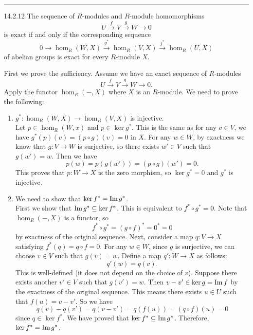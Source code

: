 \documentclass[a4paper, 12pt]{article}
\begin{document}
\noindent\rule{7in}{2.8pt}
\newpage 
\begin{problem}{14.2.12}
The sequence of \(R\)-modules and \(R\)-module homomorphisms 
\[U\xrightarrow{f}V\xrightarrow{g}W\rightarrow 0\]
is exact if and only if the corresponding sequence 
\[0\rightarrow \hom_R(W,X)\xrightarrow{g^*}\hom_R(V,X)\xrightarrow{f^*}\hom_R(U,X)\]
of abelian groups is exact for every \(R\)-module \(X\).
\end{problem}
\begin{solution}
First we prove the sufficiency. Assume we have an exact sequence of \(R\)-modules
\[U\xrightarrow{f}V\xrightarrow{g}W\rightarrow 0.\]
Apply the functor \(\hom_R(-,X)\) where \(X\) is an \(R\)-module. We need to prove the following:
\begin{enumerate}[(1)]
\item \(g^*:\hom_R(W,X)\rightarrow \hom_R(V,X)\) is injective.\\ 
Let \(p\in \hom_R(W,x)\) and \(p\in \ker g^*\). This is the same as for any \(v\in V\), we have \(g^*(p)(v)=(p\circ g)(v)=0\) in \(X\). For any \(w\in W\), by exactness we know that 
\(g:V\rightarrow W\) is surjective, so there exists \(w'\in V\) such that \(g(w')=w\). Then we have 
\[p(w)=p(g(w'))=(p\circ g)(w')=0.\]
This proves that \(p:W\rightarrow X\) is the zero morphism, so \(\ker g^*=0\) and \(g^*\) is injective.
\item We need to show that \(\ker f^*=\text{Im}\, g^*\).\\ 
First we show that \(\text{Im}\, g^*\subseteq \ker f^*\). This is equivalent to \(f^*\circ g^*=0\). Note that \(\hom_R(-,X)\) is a functor, so 
\[f^*\circ g^*=(g\circ f)^*=0^*=0\]
by exactness of the original sequence. Next, consider a map \(q:V\rightarrow X\) satisfying \(f^*(q)=q\circ f=0\). For any \(w\in W\), since \(g\) is surjective, we can choose \(v\in V\) such that \(g(v)=w\). Define 
a map \(q':W\rightarrow X\) as follows:
\[q'(w)=q(v).\]
This is well-defined (it does not depend on the choice of \(v\)). Suppose there exists another \(v'\in V\) such that \(g(v')=w\). Then \(v-v'\in \ker g=\text{Im}\, f \) by the exactness of the original sequence. This means 
there exists \(u\in U\) such that \(f(u)=v-v'\). So we have 
\[q(v)-q(v')=q(v-v')=q(f(u))=(q\circ f)(u)=0\]
since \(q\in \ker f^*\). We have proved that \(\ker f^*\subseteq \text{Im}\, g^*\). Therefore, \(\ker f^*=\text{Im}\, g^*\).

\end{enumerate}
\end{solution}
\end{document}
